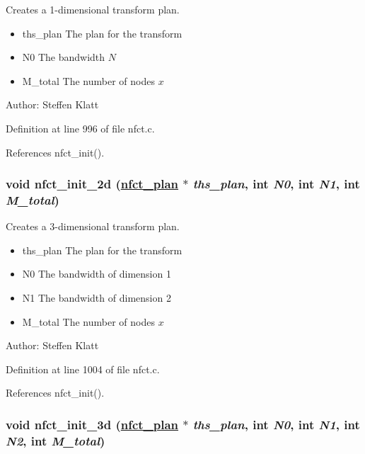 Creates a 1-dimensional transform plan. 

\begin{itemize}
\item ths\_\-plan The plan for the transform \item N0 The bandwidth $N$ \item M\_\-total The number of nodes $x$\end{itemize}
\begin{Desc}
\item[Author:]Steffen Klatt \end{Desc}


Definition at line 996 of file nfct.c.

References nfct\_\-init().\hypertarget{group__nfsct_ga1}{
\subsubsection[nfct\_\-init\_\-2d]{\setlength{\rightskip}{0pt plus 5cm}void nfct\_\-init\_\-2d (\hyperlink{structnfct__plan}{nfct\_\-plan} $\ast$ {\em ths\_\-plan}, int {\em N0}, int {\em N1}, int {\em M\_\-total})}}
\label{group__nfsct_ga1}


Creates a 3-dimensional transform plan. 

\begin{itemize}
\item ths\_\-plan The plan for the transform \item N0 The bandwidth of dimension 1 \item N1 The bandwidth of dimension 2 \item M\_\-total The number of nodes $x$\end{itemize}
\begin{Desc}
\item[Author:]Steffen Klatt \end{Desc}


Definition at line 1004 of file nfct.c.

References nfct\_\-init().\hypertarget{group__nfsct_ga2}{
\subsubsection[nfct\_\-init\_\-3d]{\setlength{\rightskip}{0pt plus 5cm}void nfct\_\-init\_\-3d (\hyperlink{structnfct__plan}{nfct\_\-plan} $\ast$ {\em ths\_\-plan}, int {\em N0}, int {\em N1}, int {\em N2}, int {\em M\_\-total})}}
\label{group__nfsct_ga2}



